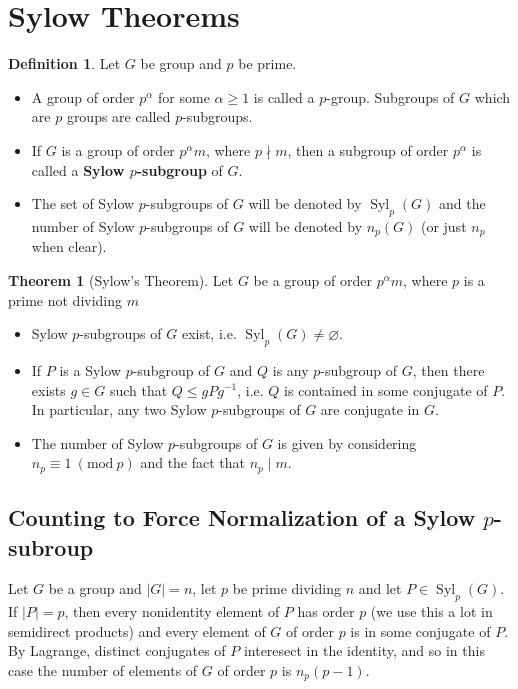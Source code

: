 \documentclass[9pt,reqno]{amsart}
\theoremstyle{definition}
\newtheorem{defi}{Definition}[section]
\newtheorem{theorem}{Theorem}[section]
\DeclareMathOperator{\syl}{Syl}
\newcommand{\Mod}[1]{\ (\mathrm{mod}\ #1)}
\begin{document}
\section{Sylow Theorems} 
\begin{defi}
Let $G$ be group and $p$ be prime. 
\begin{itemize}
	\item A group of order $p^\alpha$ for some $\alpha \geq 1$ is called a $p$-group. Subgroups of $G$ which are $p$ groups are called $p$-subgroups.
	\item If $G$ is a group of order $p^\alpha m$, where $p \nmid m$, then a subgroup of order $p^\alpha$ is called a \textbf{Sylow $p$-subgroup} of $G$.
	\item The set of Sylow $p$-subgroups of $G$ will be denoted by $\syl_p (G)$ and the number of Sylow $p$-subgroups of $G$ will be denoted by $n_p (G)$ (or just $n_p$ when clear).
\end{itemize}	
\end{defi}
\begin{theorem}[Sylow's Theorem] Let $G$ be a group of order $p^\alpha m$, where $p$ is a prime not dividing $m$
	\begin{itemize}
		\item Sylow $p$-subgroups of $G$ exist, i.e. $\syl_p (G) \neq \varnothing$.
		\item If $P$ is a Sylow $p$-subgroup of $G$ and $Q$ is any $p$-subgroup of $G$, then there exists $g \in G$ such that $Q \leq gPg^{-1}$, i.e. $Q$ is contained in some conjugate of $P$. In particular, any two Sylow $p$-subgroups of $G$ are conjugate in $G$.
		\item The number of Sylow $p$-subgroups of $G$ is given by considering $n_p \equiv 1 \Mod{p}$ and the fact that $n_p \mid m$. 
	\end{itemize}
\end{theorem}
\subsection{Counting to Force Normalization of a Sylow $p$-subroup}


Let $G$ be a group and $|G| = n$, let $p$ be prime dividing $n$ and let $P \in \syl_p (G)$. If $|P| = p$, then every nonidentity element of $P$ has order $p$ (we use this a lot in semidirect products) and every element of $G$ of order $p$ is in some conjugate of $P$. By Lagrange, distinct conjugates of $P$ interesect in the identity, and so in this case the number of elements of $G$ of order $p$ is $n_p (p-1)$. 
\end{document}
